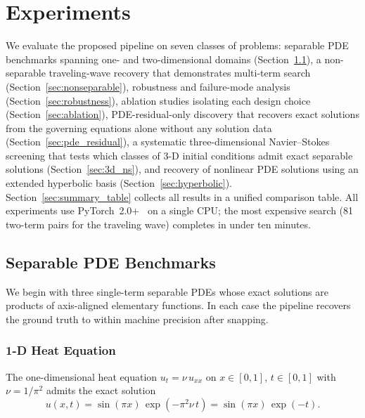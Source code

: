 \section{Experiments}
\label{sec:experiments}

We evaluate the proposed pipeline on seven classes of problems: separable PDE
benchmarks spanning one- and two-dimensional domains
(Section~\ref{sec:separable_benchmarks}), a non-separable traveling-wave
recovery that demonstrates multi-term search
(Section~\ref{sec:nonseparable}), robustness and failure-mode analysis
(Section~\ref{sec:robustness}), ablation studies isolating each design
choice (Section~\ref{sec:ablation}), PDE-residual-only discovery that
recovers exact solutions from the governing equations alone without any
solution data (Section~\ref{sec:pde_residual}), a systematic
three-dimensional Navier--Stokes screening that tests which classes of 3-D
initial conditions admit exact separable solutions
(Section~\ref{sec:3d_ns}), and recovery of nonlinear PDE solutions using
an extended hyperbolic basis (Section~\ref{sec:hyperbolic}).
Section~\ref{sec:summary_table} collects
all results in a unified comparison table.  All experiments use
PyTorch~2.0+~\citep{paszke2019} on a single CPU; the most expensive search
(81 two-term pairs for the traveling wave) completes in under ten minutes.

\subsection{Separable PDE Benchmarks}
\label{sec:separable_benchmarks}

We begin with three single-term separable PDEs whose exact solutions are
products of axis-aligned elementary functions.  In each case the pipeline
recovers the ground truth to within machine precision after snapping.

\subsubsection{1-D Heat Equation}
\label{sec:heat}

The one-dimensional heat equation $u_t = \nu\,u_{xx}$ on $x\in[0,1]$,
$t\in[0,1]$ with $\nu = 1/\pi^{2}$ admits the exact solution
\begin{equation}
  u(x,t) = \sin(\pi x)\,\exp(-\pi^{2}\nu\, t)
         = \sin(\pi x)\,\exp(-t).
  \label{eq:heat_exact}
\end{equation}


